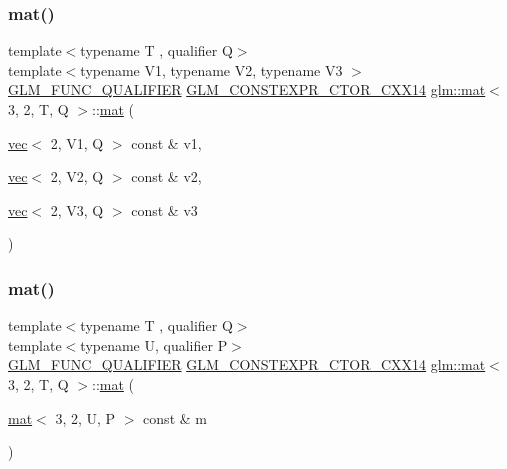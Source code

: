 \subsubsection{\texorpdfstring{mat()}{mat()}\hspace{0.1cm}{\footnotesize\ttfamily [20/21]}}
{\footnotesize\ttfamily template$<$typename T , qualifier Q$>$ \\
template$<$typename V1, typename V2, typename V3 $>$ \\
\hyperlink{setup_8hpp_a33fdea6f91c5f834105f7415e2a64407}{G\+L\+M\+\_\+\+F\+U\+N\+C\+\_\+\+Q\+U\+A\+L\+I\+F\+I\+ER} \hyperlink{setup_8hpp_a0900f9145e68bf6061b6f5e7be3fa751}{G\+L\+M\+\_\+\+C\+O\+N\+S\+T\+E\+X\+P\+R\+\_\+\+C\+T\+O\+R\+\_\+\+C\+X\+X14} \hyperlink{structglm_1_1mat}{glm\+::mat}$<$ 3, 2, T, Q $>$\+::\hyperlink{structglm_1_1mat}{mat} (\begin{DoxyParamCaption}\item[{\hyperlink{structglm_1_1vec}{vec}$<$ 2, V1, Q $>$ const \&}]{v1,  }\item[{\hyperlink{structglm_1_1vec}{vec}$<$ 2, V2, Q $>$ const \&}]{v2,  }\item[{\hyperlink{structglm_1_1vec}{vec}$<$ 2, V3, Q $>$ const \&}]{v3 }\end{DoxyParamCaption})}

\mbox{\label{structglm_1_1mat_3_013_00_012_00_01_t_00_01_q_01_4_a35a259f91ad5cca9bab10166d9df9d94}} 
\subsubsection{\texorpdfstring{mat()}{mat()}\hspace{0.1cm}{\footnotesize\ttfamily [21/21]}}
{\footnotesize\ttfamily template$<$typename T , qualifier Q$>$ \\
template$<$typename U, qualifier P$>$ \\
\hyperlink{setup_8hpp_a33fdea6f91c5f834105f7415e2a64407}{G\+L\+M\+\_\+\+F\+U\+N\+C\+\_\+\+Q\+U\+A\+L\+I\+F\+I\+ER} \hyperlink{setup_8hpp_a0900f9145e68bf6061b6f5e7be3fa751}{G\+L\+M\+\_\+\+C\+O\+N\+S\+T\+E\+X\+P\+R\+\_\+\+C\+T\+O\+R\+\_\+\+C\+X\+X14} \hyperlink{structglm_1_1mat}{glm\+::mat}$<$ 3, 2, T, Q $>$\+::\hyperlink{structglm_1_1mat}{mat} (\begin{DoxyParamCaption}\item[{\hyperlink{structglm_1_1mat}{mat}$<$ 3, 2, U, P $>$ const \&}]{m }\end{DoxyParamCaption})}



